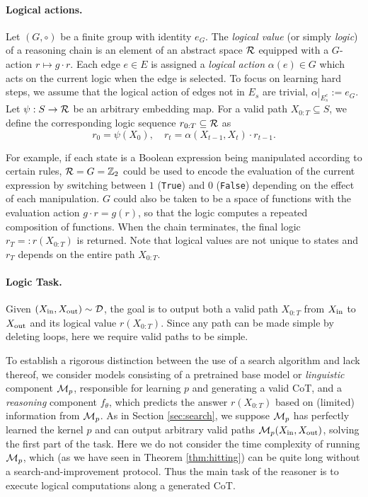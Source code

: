 \paragraph{Logical actions.} Let $(G,\circ)$ be a finite group with identity $e_G$. The \emph{logical value} (or simply \emph{logic}) of a reasoning chain is an element of an abstract space $\mathcal{R}$ equipped with a $G$-action $r\mapsto g\cdot r$. Each edge $e\in E$ is assigned a \emph{logical action} $\alpha(e)\in G$ which acts on the current logic when the edge is selected. To focus on learning hard steps, we assume that the logical action of edges not in $E_s$ are trivial, $\alpha|_{E_s^c}:=e_G$. Let $\psi:S\to\mathcal{R}$ be an arbitrary embedding map. For a valid path $X_{0:T}\subseteq S$, we define the corresponding logic sequence $r_{0:T}\subseteq \mathcal{R}$ as
\begin{equation*}
r_0 = \psi(X_0), \quad r_t = \alpha(X_{t-1},X_t) \cdot r_{t-1}.
\end{equation*}

For example, if each state is a Boolean expression being manipulated according to certain rules, $\mathcal{R}=G=\mathbb{Z}_2$ could be used to encode the evaluation of the current expression by switching between $1$ (\texttt{True}) and $0$ (\texttt{False}) depending on the effect of each manipulation. $G$ could also be taken to be a space of functions with the evaluation action $g\cdot r=g(r)$, so that the logic computes a repeated composition of functions. When the chain terminates, the final logic $r_T=:r(X_{0:T})$ is returned. Note that logical values are not unique to states and $r_T$ depends on the entire path $X_{0:T}$.

\paragraph{Logic Task.} Given $(X_{\operatorname{in}},X_{\operatorname{out}})\sim\mathcal{D}$, the goal is to output both a valid path $X_{0:T}$ from $X_{\operatorname{in}}$ to $X_{\operatorname{out}}$ and its logical value $r(X_{0:T})$. Since any path can be made simple by deleting loops, here we require valid paths to be simple.

To establish a rigorous distinction between the use of a search algorithm and lack thereof, we consider models consisting of a pretrained base model or \emph{linguistic} component $\mathcal{M}_p$, responsible for learning $p$ and generating a valid CoT, and a \emph{reasoning} component $f_\theta$, which predicts the answer $r(X_{0:T})$ based on (limited) information from $\mathcal{M}_p$.
As in Section \ref{sec:search}, we suppose $\mathcal{M}_p$ has perfectly learned the kernel $p$ and can output arbitrary valid paths $\mathcal{M}_p(X_{\operatorname{in}},X_{\operatorname{out}})$, solving the first part of the task. Here we do not consider the time complexity of running $\mathcal{M}_p$, which (as we have seen in Theorem \ref{thm:hitting}) can be quite long without a search-and-improvement protocol. Thus the main task of the reasoner is to execute logical computations along a generated CoT.


